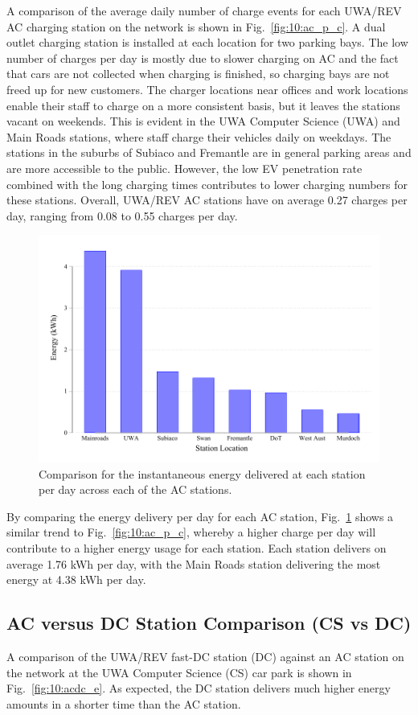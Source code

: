 A comparison of the average daily number of charge events for each UWA/REV AC charging station on the network is shown in Fig.~\ref{fig:10:ac_p_c}. A dual outlet charging station is installed at each location for two parking bays. The low number of charges per day is mostly due to slower charging on AC and the fact that cars are not collected when charging is finished, so charging bays are not freed up for new customers. The charger locations near offices and work locations enable their staff to charge on a more consistent basis, but it leaves the stations vacant on weekends. This is evident in the UWA Computer Science (UWA) and Main Roads stations, where staff charge their vehicles daily on weekdays. The stations in the suburbs of Subiaco and Fremantle are in general parking areas and are more accessible to the public. However, the low EV penetration rate combined with the long charging times contributes to lower charging numbers for these stations. Overall, UWA/REV AC stations have on average 0.27 charges per day, ranging from 0.08 to 0.55 charges per day.

\begin{figure}[H]
	\centering
	\includegraphics[width=0.8\linewidth]{ac_p_e}
	\caption[Energy delivered at each AC station per day]{Comparison for the instantaneous energy delivered at each station per day across each of the AC stations.}
	\label{fig:10:ac_p_e}
\end{figure}

By comparing the energy delivery per day for each AC station, Fig.~\ref{fig:10:ac_p_e} shows a similar trend to Fig.~\ref{fig:10:ac_p_c}, whereby a higher charge per day will contribute to a higher energy usage for each station. Each station delivers on average 1.76 kWh per day, with the Main Roads station delivering the most energy at 4.38 kWh per day.

\subsection[AC versus DC Station Comparison]{AC versus DC Station Comparison (CS vs DC)}
\label{sec:10:acdccomp}
A comparison of the UWA/REV fast-DC station (DC) against an AC station on the network at the UWA Computer Science (CS) car park is shown in Fig.~\ref{fig:10:acdc_e}. As expected, the DC station delivers much higher energy amounts in a shorter time than the AC station. 

